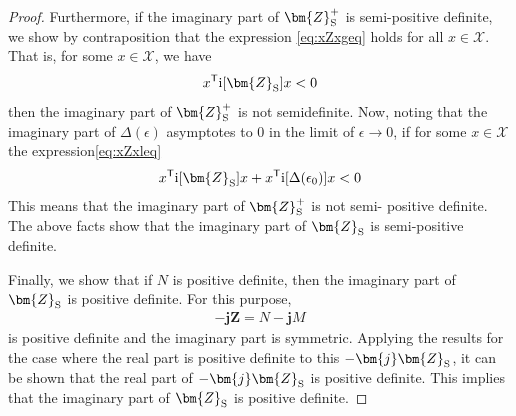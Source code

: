\documentclass[graybox, envcountchap]{svmult}
\begin{document}
\begin{proof}
Furthermore, if the imaginary part of $ \bm{Z}_{\rm S}^{+} $ is semi-positive definite, we show by contraposition that the expression \ref{eq:xZxgeq} holds for all $x \in \mathcal{X}$.
That is, for some $x \in \mathcal{X}$, we have
\begin{align}\label{eq:xZxleq}
x^{\sf T} \imag[\bm{Z}_{\rm S}] x < 0
\end{align}
then the imaginary part of $ \bm{Z}_{\rm S}^{+} $ is not semidefinite.
Now, noting that the imaginary part of $\Delta(\epsilon)$ asymptotes to 0 in the limit of $\epsilon \rightarrow 0$, if for some $x \in \mathcal{X}$ the expression\ref{eq:xZxleq}
\begin{align*}
x^{\sf T} \imag[ \bm{Z}_{\rm S}] x 
+
x^{\sf T} \imag[\Delta(\epsilon_0)]x < 0
\end{align*}
This means that the imaginary part of $\bm{Z}_{\rm S}^{+} $ is not semi- positive definite.
The above facts show that the imaginary part of $\bm{Z}_{\rm S}$ is semi-positive definite.

Finally, we show that if $N$ is positive definite, then the imaginary part of $\bm{Z}_{\rm S}$ is positive definite.
For this purpose, 
\begin{align*}
-\bm{j} \bm{Z} = N - \bm{j} M
\end{align*}
is positive definite and the imaginary part is symmetric.
Applying the results for the case where the real part is positive definite to this $-\bm{j} \bm{Z}_{\rm S}$, it can be shown that the real part of $-\bm{j} \bm{Z}_{\rm S}$ is positive definite.
This implies that the imaginary part of $\bm{Z}_{\rm S}$ is positive definite.
\end{proof}


\end{document}
